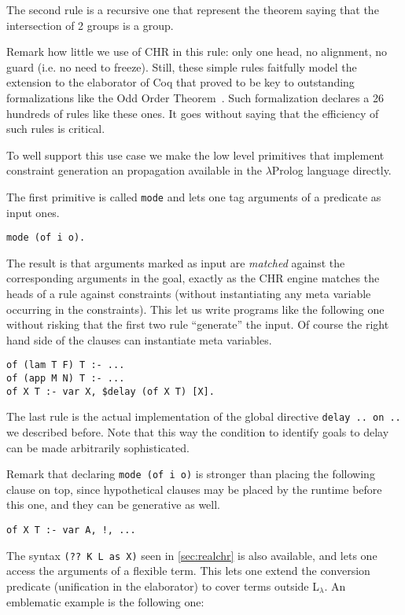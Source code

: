 \documentclass{easychair}
\begin{document}
The second rule is a recursive one that represent the theorem saying
that the intersection of 2 groups is a group.

Remark how little we use of CHR in this rule: only one head, no alignment,
no guard (i.e. no need to freeze).
Still, these simple rules faitfully model the extension to the elaborator
of Coq that proved to be key to outstanding formalizations like
the Odd Order Theorem~\cite{oothm}.  Such formalization declares a 26
hundreds of rules like these ones.  It goes without saying that
the efficiency of such rules is critical.

To well support this use case we make the low level primitives that implement
constraint generation an propagation available in the $\lambda$Prolog
language directly.

The first primitive is called \verb+mode+ and lets one tag arguments of
a predicate as input ones.

\begin{verbatim}
mode (of i o).
\end{verbatim}

The result is that arguments marked as input are \emph{matched}
against the corresponding arguments in the goal, exactly as the
CHR engine matches the heads of a rule against constraints (without
instantiating any meta variable occurring in the constraints).
This let us write programs like the following one without risking that
the first two rule ``generate'' the input.  Of course the right
hand side of the clauses can instantiate meta variables.

\begin{verbatim}
of (lam T F) T :- ...
of (app M N) T :- ...
of X T :- var X, $delay (of X T) [X].
\end{verbatim}

The last rule is the actual implementation of the global directive
\verb+delay .. on ..+ we described before.  Note that this way the
condition to identify goals to delay can be made arbitrarily
sophisticated.

Remark that declaring \verb+mode (of i o)+ is stronger than
placing the following clause on top, 
since hypothetical clauses may be placed by the runtime before this one,
and they can be generative as well.

\begin{verbatim}
of X T :- var A, !, ...
\end{verbatim}

The syntax \verb+(?? K L as X)+ seen in \ref{sec:realchr} is also
available, and lets one access the arguments of a flexible term.
This lets one extend the conversion predicate (unification in the
elaborator) to cover terms outside L$_\lambda$.  An emblematic example is
the following one:
\end{document}
